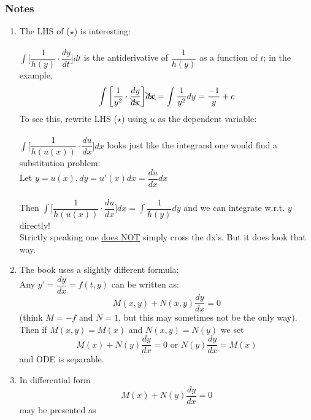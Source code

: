 \subsubsection*{Notes}
\begin{enumerate}[label=\protect\circled{\arabic*}]
	\item The LHS of ($\star$) is interesting:\\\\
	$\int \bigg[\dfrac{1}{h(y)} \cdot \dfrac{dy}{dt}\bigg] dt$ is the antiderivative of $\dfrac{1}{h(y)}$ as a function of $t$; in the example,
	\begin{equation*}
		\int \bigg[\dfrac{1}{y^2} \cdot \dfrac{dy}{\bcancel{dx}}\bigg] \bcancel{dx} = \int \dfrac{1}{y^2} dy = \dfrac{-1}{y} + c
	\end{equation*}
	To see this, rewrite LHS ($\star$) using $u$ as the dependent variable:\\\\
	$\int\bigg[\dfrac{1}{h(u(x))} \cdot \dfrac{du}{dx}\bigg] dx$ looks just like the integrand one would find a substitution problem:\\
	Let $y=u(x), dy=u'(x)dx = \dfrac{du}{dx}dx$\\\\
	Then $\int\bigg[\dfrac{1}{h(u(x))} \cdot \dfrac{du}{dx}\bigg] dx = \int \dfrac{1}{h(y)} dy$ and we can integrate w.r.t. $y$ directly!\\
	Strictly speaking one \underline{does NOT} simply cross the dx's. But it does look that way.
	\item The book uses a slightly different formula:\\
	Any $y' = \dfrac{dy}{dx} = f(t,y)$ can be written as:
	\begin{equation*}
		M(x,y) + N(x,y)\dfrac{dy}{dx} = 0
	\end{equation*}
	(think $M = -f$ and $N = 1$, but this may sometimes not be the only way).\\
	Then if $M(x,y) = M(x)$ and $N(x,y) = N(y)$ we set\\
	\begin{equation*}
		M(x) + N(y)\dfrac{dy}{dx} = 0 \text{ or } N(y)\dfrac{dy}{dx} = M(x)
	\end{equation*}
	  and ODE is separable.
	 \item In differential form
	 \begin{equation*}
	 	M(x) + N(y)\dfrac{dy}{dx} = 0
	 \end{equation*}
	 may be presented as
	 \begin{equation*}

\end{equation*}
\end{enumerate}
